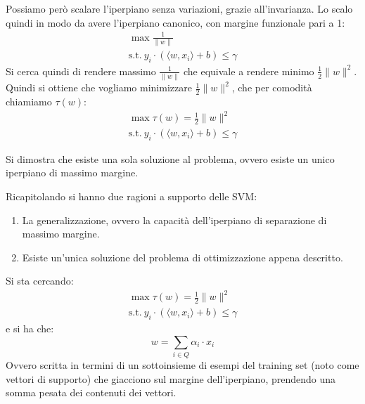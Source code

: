 Possiamo però scalare l'iperpiano senza variazioni, grazie all'invarianza. Lo scalo quindi in modo da avere l'iperpiano canonico, con margine funzionale pari a 1:
\begin{equation*}
    \begin{aligned}
        \max \frac{1}{\|w\|} \\ \text{s.t.} \ y_i \cdot (\langle w, x_i \rangle + b) \leq \gamma 
    \end{aligned}
\end{equation*}
Si cerca quindi di rendere massimo $\frac{1}{\|w\|}$ che equivale a rendere minimo $\frac{1}{2} \| w \|^2$. Quindi si ottiene che vogliamo minimizzare $\frac{1}{2} \| w \|^2$, che per comodità chiamiamo $\tau (w)$:
\begin{equation*}
    \begin{aligned}
        \max \tau(w) = \frac{1}{2}  \| w\|^2 \\ \text{s.t.} \ y_i \cdot (\langle w, x_i \rangle + b) \leq \gamma 
    \end{aligned}
\end{equation*}
\begin{teorema}
    Si dimostra che esiste una sola soluzione al problema, ovvero esiste un unico iperpiano di massimo margine.
\end{teorema}
Ricapitolando si hanno due ragioni a supporto delle SVM:
\begin{enumerate}
    \item La generalizzazione, ovvero la capacità dell'iperpiano di separazione di massimo margine.
    \item Esiste un'unica soluzione del problema di ottimizzazione appena descritto.
\end{enumerate}
Si sta cercando:
\begin{equation*}
    \begin{aligned}
        \max \tau(w) = \frac{1}{2}  \| w\|^2 \\ \text{s.t.} \ y_i \cdot (\langle w, x_i \rangle + b) \leq \gamma 
    \end{aligned}
\end{equation*}
e si ha che:
\begin{equation}
    w = \sum_{i \in Q} \alpha_i \cdot x_i
\end{equation}
Ovvero scritta in termini di un sottoinsieme di esempi del training set (noto come vettori di supporto) che giacciono sul margine dell'iperpiano, prendendo una somma pesata dei contenuti dei vettori.

